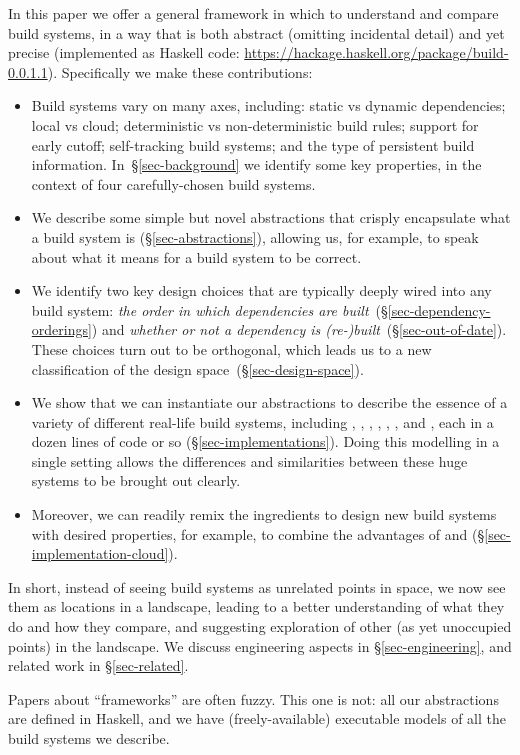 In this paper we offer a general framework in which to understand
and compare build systems,
in a way that is both abstract (omitting incidental detail)
and yet precise (implemented as Haskell code:
\url{https://hackage.haskell.org/package/build-0.0.1.1}). Specifically we make
these contributions:
\begin{itemize}
\item Build systems vary on many axes, including: static vs dynamic
  dependencies; local vs cloud; deterministic vs non-deterministic build rules;
  support for early cutoff; self-tracking build systems; and the type of
  persistent build information. In~\S\ref{sec-background} we identify some key
  properties, in the context of four carefully-chosen build systems.

\item We describe some simple but novel abstractions that
  crisply encapsulate what a build system is (\S\ref{sec-abstractions}),
  allowing us, for example, to speak about what it means for a build system to be correct.

\item We identify two key design choices that are typically deeply wired into
  any build system: \emph{the order in which dependencies are
  built}~(\S\ref{sec-dependency-orderings}) and \emph{whether or not a
  dependency is (re-)built}~(\S\ref{sec-out-of-date}). These choices turn out to
  be orthogonal, which leads us to a new classification of the design
  space~(\S\ref{sec-design-space}).

\item We show that we can instantiate our abstractions to describe the essence
of a variety of different real-life build systems, including \Make, \Shake,
\Bazel, \CloudBuild, \Buck, \Nix, and \Excel, each in a dozen lines of code
or so (\S\ref{sec-implementations}). Doing this modelling in a single setting
allows the differences and similarities between these huge systems to be
brought out clearly.

\item Moreover, we can readily remix the ingredients to design new build systems
with desired properties, for example, to combine the advantages of \Shake and
\Bazel (\S\ref{sec-implementation-cloud}).

\end{itemize}
In short, instead of seeing build systems as unrelated
points in space, we now see them as locations in a landscape,
leading to a better understanding of what they do and how they compare,
and suggesting exploration of other (as yet unoccupied points) in the
landscape.
We discuss engineering aspects in \S\ref{sec-engineering}, and related
work in \S\ref{sec-related}.

Papers about ``frameworks'' are often fuzzy.  This one is not: all our
abstractions are defined in Haskell, and we have (freely-available)
executable models of all the build systems we describe.
